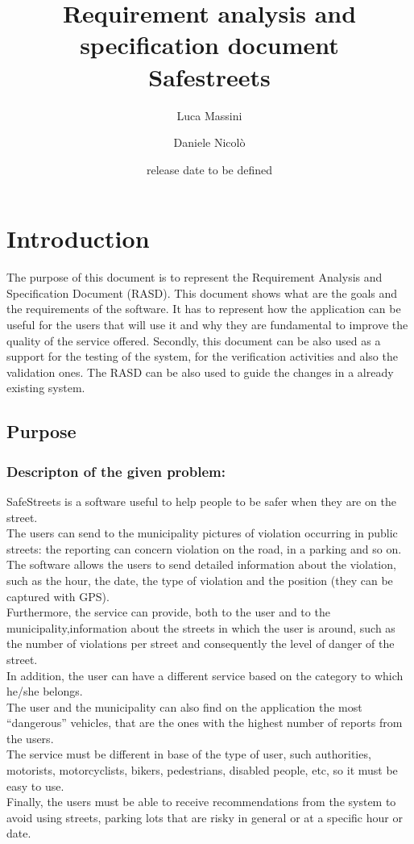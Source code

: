 \documentclass[titlepage]{article}
\author{Luca Massini \and Daniele Nicolò}
\title{Requirement analysis and specification document
\\ Safestreets}
\date{release date to be defined}
\begin{document}
\maketitle
\newpage 
\tableofcontents
\newpage

\section{Introduction}
The purpose of this document is to represent the Requirement Analysis and Specification Document (RASD).
This document shows what are the goals and the requirements of the software.
It has to represent how the application can be useful for the users that will use it and why they are fundamental to improve the quality of the service offered. Secondly, this document can be also used as a support for the testing of the system, for the verification activities and also the validation ones. The RASD can be also used to guide the changes in a already existing system.
\subsection{Purpose}

\subsubsection{Descripton of the given problem:}
SafeStreets is a software useful to help people to be safer when they are on the street.\\
The users can send to the municipality pictures of violation occurring in public streets: the reporting can concern violation on the road, in a parking and so on.\\
The software allows the users to send detailed information about the violation, such as the hour, the date, the type of violation and the position (they can be captured with GPS).\\
Furthermore, the service can provide, both to the user and to the municipality,information about the streets in which the user is around,
such as the number of violations per street and consequently the level of danger of the street.\\
In addition, the user can have a different service based on the category to which he/she belongs.\\
The user and the municipality can also find on the application the most “dangerous” vehicles, that are the ones with the highest number of reports from the users.\\
The service must be different in base of the type of user, such  authorities, motorists, motorcyclists, bikers, pedestrians, disabled people, etc, so it must be easy to use.\\
Finally, the users must be able to receive recommendations from the system to avoid using streets, parking lots that are risky in general or at a specific hour or date.\\
\end{document}
